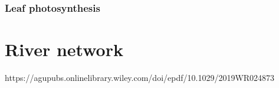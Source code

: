 \documentclass{report}
\begin{document}
\subsection{Leaf photosynthesis}







\chapter{River network}
https://agupubs.onlinelibrary.wiley.com/doi/epdf/10.1029/2019WR024873



\end{document}
